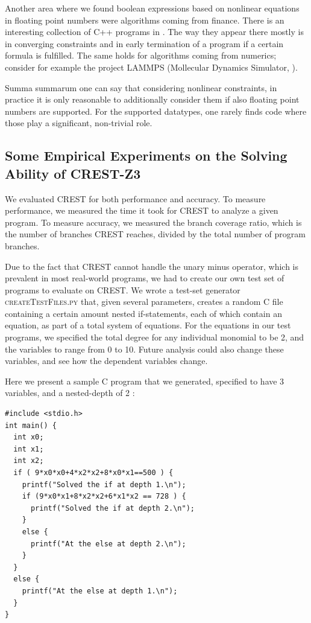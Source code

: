 \documentclass[oribibl, twocolumn]{llncs}
\begin{document}
Another area where we found boolean expressions based on nonlinear equations in floating point numbers were algorithms coming from finance. There is an interesting collection of \textsc{C++} programs in \cite{odegaard2003financial}. The way they appear there mostly is in converging constraints and in early termination of a program if a certain formula is fulfilled. The same holds for algorithms coming from numerics; consider for example the project \textsc{LAMMPS} (Mollecular Dynamics Simulator, \cite{plimpton2007lammps}).

Summa summarum one can say that considering nonlinear constraints, in practice it is only reasonable to additionally consider them if also floating point numbers are supported. For the supported datatypes, one rarely finds code where those play a significant, non-trivial role.

\subsection{Some Empirical Experiments on the Solving Ability of \textsc{CREST-Z3}}
We evaluated CREST for both performance and accuracy. To measure performance, we measured the time it took for CREST to analyze a given program. To measure accuracy, we measured the branch coverage ratio, which is the number of branches CREST reaches, divided by the total number of program branches.

Due to the fact that CREST cannot handle the unary minus operator, which is prevalent in most real-world programs, we had to create our own test set of programs to evaluate on CREST. We wrote a test-set generator \textsc{createTestFiles.py} that, given several parameters, creates a random C file containing a certain amount nested if-statements, each of which contain an equation, as part of a total system of equations. For the equations in our test programs, we specified the total degree for any individual monomial to be 2, and the variables to range from 0 to 10. Future analysis could also change these variables, and see how the dependent variables change.

Here we present a sample C program that we generated, specified to have 3 variables, and a nested-depth of 2 :

\begin{verbatim}
#include <stdio.h>
int main() {
  int x0;
  int x1;
  int x2;
  if ( 9*x0*x0+4*x2*x2+8*x0*x1==500 ) {
    printf("Solved the if at depth 1.\n");
    if (9*x0*x1+8*x2*x2+6*x1*x2 == 728 ) {
      printf("Solved the if at depth 2.\n");
    }
    else {
      printf("At the else at depth 2.\n");
    }
  }
  else {
    printf("At the else at depth 1.\n");
  }
}
\end{verbatim}
\end{document}
